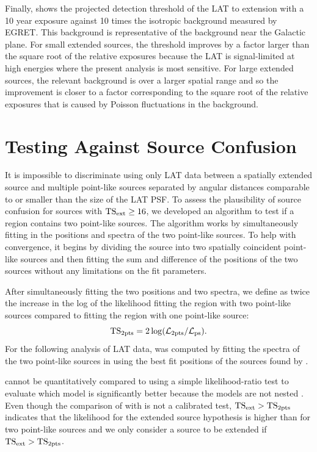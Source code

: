 Finally,  shows the projected detection
threshold of the LAT to extension with a 10 year exposure against 10
times the isotropic background measured by EGRET. This background is
representative of the background near the Galactic plane.  For small
extended sources, the threshold improves by a factor larger than the
square root of the relative exposures because the LAT is signal-limited
at high energies where the present analysis is most sensitive. For large
extended sources, the relevant background is over a larger spatial range
and so the improvement is closer to a factor corresponding to the square
root of the relative exposures that is caused by Poisson fluctuations
in the background.

\section{Testing Against Source Confusion}

It is impossible to discriminate using only LAT data between a spatially
extended source and multiple point-like sources separated by angular
distances comparable to or smaller than the size of the LAT PSF.
To assess the plausibility of source confusion for sources with
$\mathrm{TS}_\mathrm{ext}\ge16$, we developed an algorithm to test if a region contains
two point-like sources.  The algorithm works by simultaneously fitting
in \pointlike the positions and spectra of the two point-like sources.
To help with convergence, it begins by dividing the source into two
spatially coincident point-like sources and then fitting the sum and
difference of the positions of the two sources without any limitations
on the fit parameters.

After simultaneously fitting the two positions and two spectra, we define
\tsinc as twice the increase in the log of the likelihood fitting the
region with two point-like sources compared to fitting the region with
one point-like source:
\begin{equation}
  \mathrm{TS}_{\mathrm{2pts}}=2\log(\mathcal{L}_\text{2pts}/\mathcal{L}_\text{ps}).
\end{equation} 
For the following analysis of LAT data, \tsinc was computed by fitting
the spectra of the two point-like sources in \gtlike using the best fit
positions of the sources found by \pointlike.

\tsinc cannot be quantitatively compared to \tsext using
a simple likelihood-ratio test to evaluate which model
is significantly better because the models are not nested
\citep{protassov_2002a_statistics-handle}.  Even though the comparison of
\tsext with \tsinc is not a calibrated test, $\mathrm{TS}_\mathrm{ext}>\mathrm{TS}_{\mathrm{2pts}}$ indicates
that the likelihood for the extended source hypothesis is higher than
for two point-like sources and we only consider a source to be extended
if $\mathrm{TS}_\mathrm{ext}>\mathrm{TS}_{\mathrm{2pts}}$.


